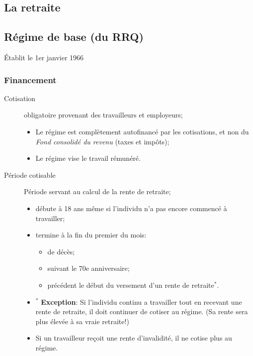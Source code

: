 \documentclass[10pt, french]{article}
\begin{document}
\begin{multicols*}{3}
\clearpage 

\section*{La retraite}

\subsection*{Régime de base (du RRQ)}
\begin{rappel_enhanced}[Historique]
Établit le 1er janvier 1966
\end{rappel_enhanced}
 
\subsubsection*{Financement}
\begin{description}
	\item[Cotisation]	obligatoire provenant des travailleurs et employeurs;
		\begin{itemize}[leftmargin = *]
			\item	Le régime est complètement autofinancé par les cotisations, et non du \textit{Fond consolidé du revenu} (taxes et impôts);
			\item	Le régime vise le travail rémunéré.
		\end{itemize}
	\item[Période cotisable]	Période servant au calcul de la rente de retraite;
		\begin{itemize}[leftmargin = *]
			\item	débute à 18 ans même si l'individu n'a pas encore commencé à travailler;
			\item	termine à la fin du premier du mois:  
				\begin{itemize}[leftmargin = *]
				\item	de décès;
				\item	suivant le 70e anniversaire;
				\item	précédent le début du versement d'un rente de retraite$^{*}$.
				\end{itemize}
			\item[]	$^{*}$ \textbf{Exception}: Si l'individu continu a travailler tout en recevant une rente de retraite, il doit continuer de cotiser au régime. (Sa rente sera plus élevée à sa vraie retraite!)
			\item	Si un travailleur reçoit une rente d'invalidité, il ne cotise plus au régime.

\end{itemize}
\end{description}
\end{multicols*}
\end{document}
